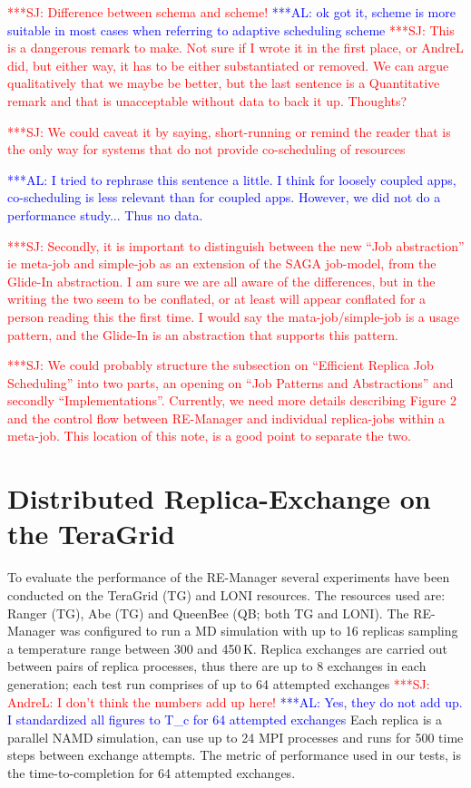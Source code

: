 \documentclass{rspublic}
\newcommand{\alnote}[1]{ {\textcolor{blue} { ***AL: #1 }}}
\newcommand{\jhanote}[1]{ {\textcolor{red} { ***SJ: #1 }}}
\newcommand{\alnote}[1]{}
\newcommand{\jhanote}[1]{}
\newcommand{\glidein}[1]{Glide-In }
\newcommand{\remanager}[1]{RE-Manager }
\begin{document}
\jhanote{Difference between schema and scheme!}
\alnote{ok got it, scheme is more suitable in most cases when referring to adaptive
scheduling scheme}
\jhanote{This is a dangerous remark to
  make. Not sure if I wrote it in the first place, or AndreL did, but
  either way, it has to be either substantiated or removed. We can
  argue qualitatively that we maybe be better, but the last sentence
  is a Quantitative remark and that is unacceptable without data to
  back it up. Thoughts?}

\jhanote{We could caveat it by saying, short-running or remind the
  reader that is the only way for systems that do not provide
  co-scheduling of resources}

\alnote{I tried to rephrase this sentence a little. I think for loosely coupled
apps, co-scheduling is less relevant than for coupled apps. However,
we did not do a performance study... Thus no data.}   

\jhanote{Secondly, it is important to distinguish between the new
  ``Job abstraction'' ie meta-job and simple-job as an extension of
  the SAGA job-model, from the \glidein\ abstraction. I am sure we are
  all aware of the differences, but in the writing the two seem to be
  conflated, or at least will appear conflated for a person reading
  this the first time. I would say the mata-job/simple-job is a usage
  pattern, and the \glidein\ is an abstraction that supports this
  pattern.}

\jhanote{We could probably structure the subsection on ``Efficient
  Replica Job Scheduling'' into two parts, an opening on ``Job
  Patterns and Abstractions'' and secondly
  ``Implementations''. Currently, we need more details describing
  Figure 2 and the control flow between \remanager\ and individual
  replica-jobs within a meta-job. This location of this note, is a
  good point to separate the two.}    


\section{Distributed Replica-Exchange on the TeraGrid}
\label{sec:exp}
        
To evaluate the performance of the RE-Manager several experiments have
been conducted on the TeraGrid (TG) and LONI resources. The resources
used are: Ranger (TG), Abe (TG) and QueenBee (QB; both TG and LONI).
The RE-Manager was configured to run a MD simulation with up to 16
replicas sampling a temperature range between 300 and 450\,K. Replica
exchanges are carried out between pairs of replica processes, thus
there are up to 8 exchanges in each generation; each test run comprises
of up to 64 attempted exchanges\jhanote{AndreL: I don't think the
  numbers add up here!}  \alnote{Yes, they do not add up. I
  standardized all figures to T\_c for 64 attempted exchanges} Each
replica is a parallel NAMD simulation, can use up to 24 MPI processes
and runs for 500 time steps between exchange attempts. The metric of
performance used in our tests, is the time-to-completion for 64
attempted exchanges.
\end{document}
